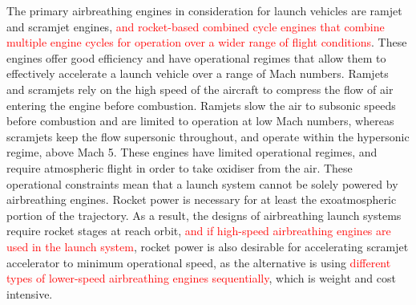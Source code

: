   	The primary airbreathing engines in consideration for launch vehicles are ramjet and scramjet engines, \textcolor{red}{and rocket-based combined cycle engines that combine multiple engine cycles for operation over a wider range of flight conditions}\cite{HeiserWilliamPratt1994,Kors1988}. These engines offer good efficiency and have operational regimes that allow them to effectively accelerate a launch vehicle over a range of Mach numbers. 
  	Ramjets and scramjets rely on the high speed of the aircraft to compress the flow of air entering the engine before combustion.  Ramjets slow the air to subsonic speeds before combustion and are limited to operation at low Mach numbers, whereas scramjets keep the flow supersonic throughout, and operate within the hypersonic regime, above Mach 5. 
  	These engines have limited operational regimes, and require atmospheric flight in order to take oxidiser from the air. These operational constraints mean that a launch system cannot be solely powered by airbreathing engines. Rocket power is necessary for at least the exoatmospheric portion of the trajectory. As a result, the designs of airbreathing launch systems require rocket stages at reach orbit\cite{Smart2009a}, \textcolor{red}{and if high-speed airbreathing engines are used in the launch system}, rocket power is also desirable for accelerating scramjet accelerator to minimum operational speed, as the alternative is using \textcolor{red}{different types of lower-speed airbreathing engines sequentially}\cite{Smart2009a}, which is weight and cost intensive. 
  	
